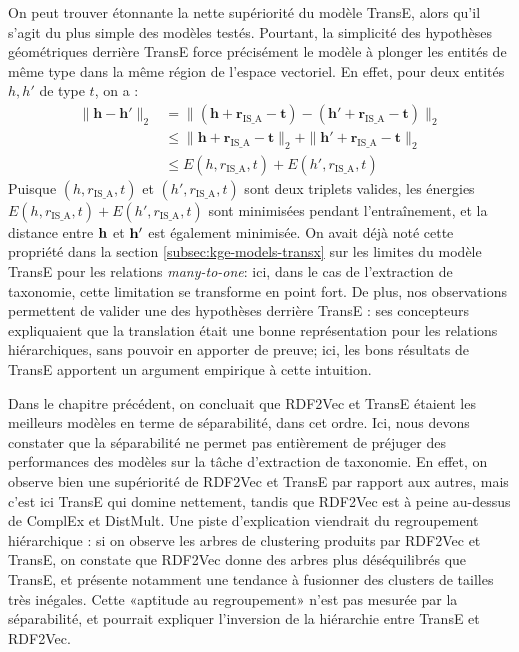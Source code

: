 On peut trouver étonnante la nette supériorité du modèle TransE, alors qu'il s'agit du plus simple des modèles testés. Pourtant, la simplicité des hypothèses géométriques derrière TransE force précisément le modèle à plonger les entités de même type dans la même région de l'espace vectoriel. En effet, pour deux entités $h, h'$ de type $t$, on a :
\begin{align*}
    \| \mathbf{h} - \mathbf{h}'\|_2 &= \| (\mathbf{h} + \mathbf{r}_{\text{IS\_A}} - \mathbf{t}) - (\mathbf{h}' + \mathbf{r}_{\text{IS\_A}} - \mathbf{t}) \|_2 \\
        &\leq \| \mathbf{h} + \mathbf{r}_{\text{IS\_A}} - \mathbf{t} \|_2 +  \| \mathbf{h}' + \mathbf{r}_{\text{IS\_A}} - \mathbf{t} \|_2 \\
        &\leq E(h, r_{\text{IS\_A}}, t) + E(h', r_{\text{IS\_A}}, t)
\end{align*}
Puisque $(h, r_{\text{IS\_A}}, t)$ et $(h', r_{\text{IS\_A}}, t)$ sont deux triplets valides, les énergies $E(h, r_{\text{IS\_A}}, t) + E(h', r_{\text{IS\_A}}, t)$ sont minimisées pendant l'entraînement, et la distance entre $\bf{h}$ et $\bf{h'}$ est également minimisée. 
On avait déjà noté cette propriété dans la section \ref{subsec:kge-models-transx} sur les limites du modèle TransE pour les relations \textit{many-to-one}: ici, dans le cas de l'extraction de taxonomie, cette limitation se transforme en point fort. De plus, nos observations permettent de valider une des hypothèses derrière TransE : ses concepteurs expliquaient que la translation était une bonne représentation pour les relations hiérarchiques, sans pouvoir en apporter de preuve; ici, les bons résultats de TransE apportent un argument empirique à cette intuition.

Dans le chapitre précédent, on concluait que RDF2Vec et TransE étaient les meilleurs modèles en terme de séparabilité, dans cet ordre. Ici, nous devons constater que la séparabilité ne permet pas entièrement de préjuger des performances des modèles sur la tâche d'extraction de taxonomie. En effet, on observe bien une supériorité de RDF2Vec et TransE par rapport aux autres, mais c'est ici TransE qui domine nettement, tandis que RDF2Vec est à peine au-dessus de ComplEx et DistMult. Une piste d'explication viendrait du regroupement hiérarchique : si on observe les arbres de clustering produits par RDF2Vec et TransE, on constate que RDF2Vec donne des arbres plus déséquilibrés que TransE, et présente notamment une tendance à fusionner des clusters de tailles très inégales. Cette «aptitude au regroupement» n'est pas mesurée par la séparabilité, et pourrait expliquer l'inversion de la hiérarchie entre TransE et RDF2Vec. 

